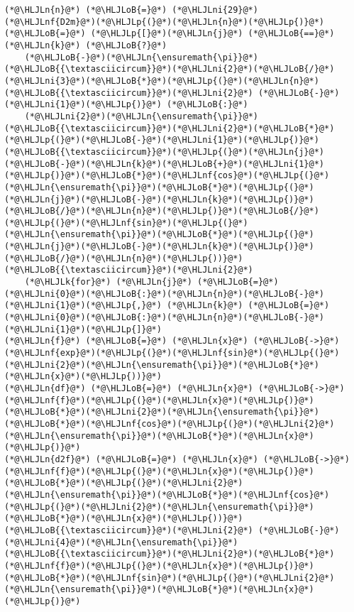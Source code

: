 \documentclass[12pt,landscape]{article}
\newcommand{\HLJLk}[1]{\textcolor[RGB]{148,91,176}{\textbf{#1}}}
\newcommand{\HLJLn}[1]{#1}
\newcommand{\HLJLnf}[1]{\textcolor[RGB]{66,102,213}{#1}}
\newcommand{\HLJLni}[1]{\textcolor[RGB]{59,151,46}{#1}}
\newcommand{\HLJLoB}[1]{\textcolor[RGB]{102,102,102}{\textbf{#1}}}
\newcommand{\HLJLp}[1]{#1}
\begin{document}
{\begin{lstlisting}
(*@\HLJLn{n}@*) (*@\HLJLoB{=}@*) (*@\HLJLni{29}@*)
(*@\HLJLnf{D2m}@*)(*@\HLJLp{(}@*)(*@\HLJLn{n}@*)(*@\HLJLp{)}@*) (*@\HLJLoB{=}@*) (*@\HLJLp{[}@*)(*@\HLJLn{j}@*) (*@\HLJLoB{==}@*) (*@\HLJLn{k}@*) (*@\HLJLoB{?}@*) 
    (*@\HLJLoB{-}@*)(*@\HLJLn{\ensuremath{\pi}}@*)(*@\HLJLoB{{\textasciicircum}}@*)(*@\HLJLni{2}@*)(*@\HLJLoB{/}@*)(*@\HLJLni{3}@*)(*@\HLJLoB{*}@*)(*@\HLJLp{(}@*)(*@\HLJLn{n}@*)(*@\HLJLoB{{\textasciicircum}}@*)(*@\HLJLni{2}@*) (*@\HLJLoB{-}@*) (*@\HLJLni{1}@*)(*@\HLJLp{)}@*) (*@\HLJLoB{:}@*) 
    (*@\HLJLni{2}@*)(*@\HLJLn{\ensuremath{\pi}}@*)(*@\HLJLoB{{\textasciicircum}}@*)(*@\HLJLni{2}@*)(*@\HLJLoB{*}@*)(*@\HLJLp{(}@*)(*@\HLJLoB{-}@*)(*@\HLJLni{1}@*)(*@\HLJLp{)}@*)(*@\HLJLoB{{\textasciicircum}}@*)(*@\HLJLp{(}@*)(*@\HLJLn{j}@*)(*@\HLJLoB{-}@*)(*@\HLJLn{k}@*)(*@\HLJLoB{+}@*)(*@\HLJLni{1}@*)(*@\HLJLp{)}@*)(*@\HLJLoB{*}@*)(*@\HLJLnf{cos}@*)(*@\HLJLp{(}@*)(*@\HLJLn{\ensuremath{\pi}}@*)(*@\HLJLoB{*}@*)(*@\HLJLp{(}@*)(*@\HLJLn{j}@*)(*@\HLJLoB{-}@*)(*@\HLJLn{k}@*)(*@\HLJLp{)}@*)(*@\HLJLoB{/}@*)(*@\HLJLn{n}@*)(*@\HLJLp{)}@*)(*@\HLJLoB{/}@*)(*@\HLJLp{(}@*)(*@\HLJLnf{sin}@*)(*@\HLJLp{(}@*)(*@\HLJLn{\ensuremath{\pi}}@*)(*@\HLJLoB{*}@*)(*@\HLJLp{(}@*)(*@\HLJLn{j}@*)(*@\HLJLoB{-}@*)(*@\HLJLn{k}@*)(*@\HLJLp{)}@*)(*@\HLJLoB{/}@*)(*@\HLJLn{n}@*)(*@\HLJLp{))}@*)(*@\HLJLoB{{\textasciicircum}}@*)(*@\HLJLni{2}@*) 
    (*@\HLJLk{for}@*) (*@\HLJLn{j}@*) (*@\HLJLoB{=}@*) (*@\HLJLni{0}@*)(*@\HLJLoB{:}@*)(*@\HLJLn{n}@*)(*@\HLJLoB{-}@*)(*@\HLJLni{1}@*)(*@\HLJLp{,}@*) (*@\HLJLn{k}@*) (*@\HLJLoB{=}@*) (*@\HLJLni{0}@*)(*@\HLJLoB{:}@*)(*@\HLJLn{n}@*)(*@\HLJLoB{-}@*)(*@\HLJLni{1}@*)(*@\HLJLp{]}@*)
(*@\HLJLn{f}@*) (*@\HLJLoB{=}@*) (*@\HLJLn{x}@*) (*@\HLJLoB{->}@*) (*@\HLJLnf{exp}@*)(*@\HLJLp{(}@*)(*@\HLJLnf{sin}@*)(*@\HLJLp{(}@*)(*@\HLJLni{2}@*)(*@\HLJLn{\ensuremath{\pi}}@*)(*@\HLJLoB{*}@*)(*@\HLJLn{x}@*)(*@\HLJLp{))}@*)
(*@\HLJLn{df}@*) (*@\HLJLoB{=}@*) (*@\HLJLn{x}@*) (*@\HLJLoB{->}@*) (*@\HLJLnf{f}@*)(*@\HLJLp{(}@*)(*@\HLJLn{x}@*)(*@\HLJLp{)}@*)(*@\HLJLoB{*}@*)(*@\HLJLni{2}@*)(*@\HLJLn{\ensuremath{\pi}}@*)(*@\HLJLoB{*}@*)(*@\HLJLnf{cos}@*)(*@\HLJLp{(}@*)(*@\HLJLni{2}@*)(*@\HLJLn{\ensuremath{\pi}}@*)(*@\HLJLoB{*}@*)(*@\HLJLn{x}@*)(*@\HLJLp{)}@*)
(*@\HLJLn{d2f}@*) (*@\HLJLoB{=}@*) (*@\HLJLn{x}@*) (*@\HLJLoB{->}@*) (*@\HLJLnf{f}@*)(*@\HLJLp{(}@*)(*@\HLJLn{x}@*)(*@\HLJLp{)}@*)(*@\HLJLoB{*}@*)(*@\HLJLp{(}@*)(*@\HLJLni{2}@*)(*@\HLJLn{\ensuremath{\pi}}@*)(*@\HLJLoB{*}@*)(*@\HLJLnf{cos}@*)(*@\HLJLp{(}@*)(*@\HLJLni{2}@*)(*@\HLJLn{\ensuremath{\pi}}@*)(*@\HLJLoB{*}@*)(*@\HLJLn{x}@*)(*@\HLJLp{))}@*)(*@\HLJLoB{{\textasciicircum}}@*)(*@\HLJLni{2}@*) (*@\HLJLoB{-}@*) (*@\HLJLni{4}@*)(*@\HLJLn{\ensuremath{\pi}}@*)(*@\HLJLoB{{\textasciicircum}}@*)(*@\HLJLni{2}@*)(*@\HLJLoB{*}@*)(*@\HLJLnf{f}@*)(*@\HLJLp{(}@*)(*@\HLJLn{x}@*)(*@\HLJLp{)}@*)(*@\HLJLoB{*}@*)(*@\HLJLnf{sin}@*)(*@\HLJLp{(}@*)(*@\HLJLni{2}@*)(*@\HLJLn{\ensuremath{\pi}}@*)(*@\HLJLoB{*}@*)(*@\HLJLn{x}@*)(*@\HLJLp{)}@*)

\end{lstlisting}}
\end{document}
